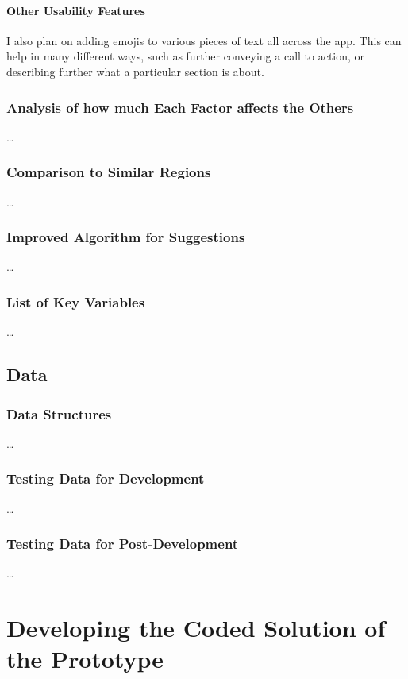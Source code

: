 \documentclass[12pt]{report}
\begin{document}
\subsubsection{Other Usability Features}
I also plan on adding emojis to various pieces of text all across the app. This can help in many different ways, such as further conveying a call to action, or describing further what a particular section is about.

\subsection{Analysis of how much Each Factor affects the Others}\label{sec:analysisOfFactors}
\dots

\subsection{Comparison to Similar Regions}\label{sec:comparisonToRegions}
\dots

\subsection{Improved Algorithm for Suggestions}\label{sec:betterSuggestions}
\dots

\subsection{List of Key Variables}
\dots

\section{Data}
\subsection{Data Structures}
\dots

\subsection{Testing Data for Development}
\dots

\subsection{Testing Data for Post-Development}
\dots

\chapter{Developing the Coded Solution of the  Prototype}
\end{document}
